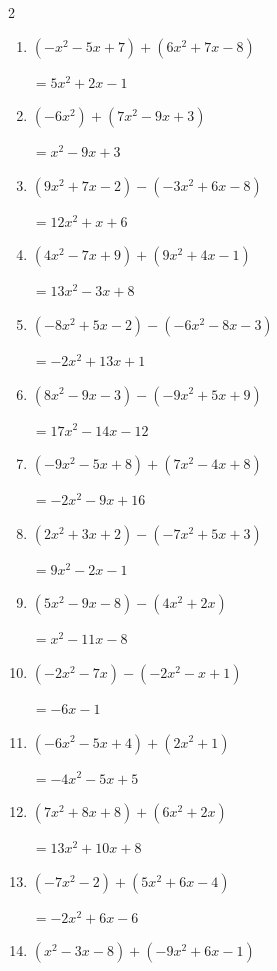 \begin{multicols}{2}
\begin{enumerate}
  \item $(-x^{2}-5x+7)+(6x^{2}+7x-8)$

        $=5x^{2}+2x-1$

  \item $(-6x^{2})+(7x^{2}-9x+3)$

        $=x^{2}-9x+3$

\columnbreak %

\resetques

  \item $(9x^{2}+7x-2)-(-3x^{2}+6x-8)$

        $=12x^{2}+x+6$

  \item $(4x^{2}-7x+9)+(9x^{2}+4x-1)$

        $=13x^{2}-3x+8$

  \item $(-8x^{2}+5x-2)-(-6x^{2}-8x-3)$

        $=-2x^{2}+13x+1$

  \item $(8x^{2}-9x-3)-(-9x^{2}+5x+9)$

        $=17x^{2}-14x-12$

  \item $(-9x^{2}-5x+8)+(7x^{2}-4x+8)$

        $=-2x^{2}-9x+16$

  \item $(2x^{2}+3x+2)-(-7x^{2}+5x+3)$

        $=9x^{2}-2x-1$

  \item $(5x^{2}-9x-8)-(4x^{2}+2x)$

        $=x^{2}-11x-8$

  \item $(-2x^{2}-7x)-(-2x^{2}-x+1)$

        $=-6x-1$

  \item $(-6x^{2}-5x+4)+(2x^{2}+1)$

        $=-4x^{2}-5x+5$

  \item $(7x^{2}+8x+8)+(6x^{2}+2x)$

        $=13x^{2}+10x+8$

  \item $(-7x^{2}-2)+(5x^{2}+6x-4)$

        $=-2x^{2}+6x-6$

  \item $(x^{2}-3x-8)+(-9x^{2}+6x-1)$


\end{enumerate}
\end{multicols}
